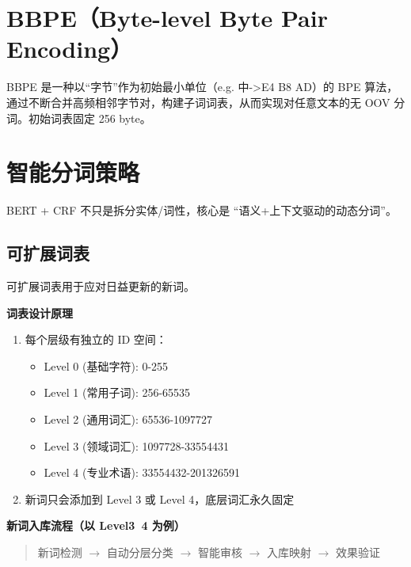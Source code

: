 \documentclass[11pt, a4paper]{article}
\begin{document}
\section{BBPE（Byte-level Byte Pair Encoding）}

BBPE 是一种以“字节”作为初始最小单位（e.g. 中->E4 B8 AD）的 BPE 算法，通过不断合并高频相邻字节对，构建子词词表，从而实现对任意文本的无 OOV 分词。初始词表固定 256 byte。

\section{智能分词策略}

BERT + CRF 不只是拆分实体/词性，核心是 “语义+上下文驱动的动态分词”。

\subsection*{可扩展词表}
可扩展词表用于应对日益更新的新词。

\textbf{词表设计原理}
\begin{enumerate}
    \item 每个层级有独立的 ID 空间：
    \begin{itemize}
        \item Level 0 (基础字符): 0-255
        \item Level 1 (常用子词): 256-65535
        \item Level 2 (通用词汇): 65536-1097727
        \item Level 3 (领域词汇): 1097728-33554431
        \item Level 4 (专业术语): 33554432-201326591
    \end{itemize}
    \item 新词只会添加到 Level 3 或 Level 4，底层词汇永久固定
\end{enumerate}

\textbf{新词入库流程（以 Level3~4 为例）}
\begin{quote}
新词检测 $\rightarrow$ 自动分层分类 $\rightarrow$ 智能审核 $\rightarrow$ 入库映射 $\rightarrow$ 效果验证
\end{quote}
\end{document}
